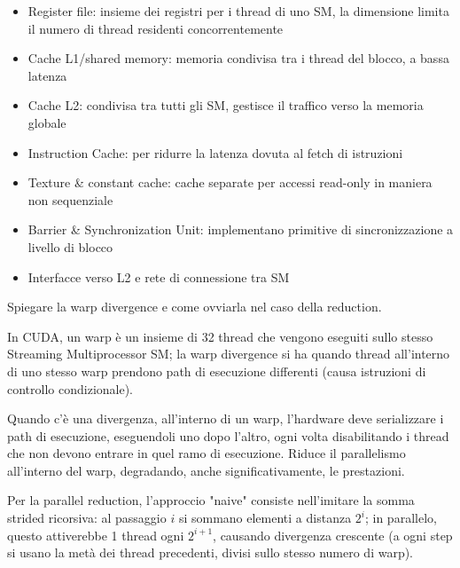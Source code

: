 \begin{questions}
\begin{solution}
\begin{itemize}
            \item Register file: insieme dei registri per i thread di uno SM, la dimensione limita il numero di thread residenti concorrentemente 
            
            \item Cache L1/shared memory: memoria condivisa tra i thread del blocco, a bassa latenza
            
            \item Cache L2: condivisa tra tutti gli SM, gestisce il traffico verso la memoria globale
            
            \item Instruction Cache: per ridurre la latenza dovuta al fetch di istruzioni
            
            \item Texture \& constant cache: cache separate per accessi read-only in maniera non sequenziale
            
            \item Barrier \& Synchronization Unit: implementano primitive di sincronizzazione a livello di blocco
            
            \item Interfacce verso L2 e rete di connessione tra SM
        \end{itemize}
    \end{solution}
    
    \question Spiegare la warp divergence e come ovviarla nel caso della reduction.
    
    \begin{solution}
        In CUDA, un warp è un insieme di 32 thread che vengono eseguiti sullo stesso Streaming Multiprocessor SM; la warp divergence si ha quando thread all'interno di uno stesso warp prendono path di esecuzione differenti (causa istruzioni di controllo condizionale).
        
        Quando c'è una divergenza, all'interno di un warp, l'hardware deve serializzare i path di esecuzione, eseguendoli uno dopo l'altro, ogni volta disabilitando i thread che non devono entrare in quel ramo di esecuzione. Riduce il parallelismo all'interno del warp, degradando, anche significativamente, le prestazioni.
        
        Per la parallel reduction, l'approccio "naive" consiste nell'imitare la somma strided ricorsiva: al passaggio $i$ si sommano elementi a distanza $2^i$; in parallelo, questo attiverebbe 1 thread ogni $2^{i+1}$, causando divergenza crescente (a ogni step si usano la metà dei thread precedenti, divisi sullo stesso numero di warp).
        

\end{solution}
\end{questions}
